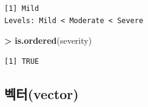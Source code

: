 \documentclass[11pt,a4paper]{book}
\newenvironment{Shaded}{\begin{snugshade}}{\end{snugshade}}
\newcommand{\KeywordTok}[1]{\textcolor[rgb]{0.13,0.29,0.53}{\textbf{#1}}}
\newcommand{\StringTok}[1]{\textcolor[rgb]{0.31,0.60,0.02}{#1}}
\newcommand{\OperatorTok}[1]{\textcolor[rgb]{0.81,0.36,0.00}{\textbf{#1}}}
\newcommand{\NormalTok}[1]{#1}
\theoremstyle{definition}
\theoremstyle{definition}
\theoremstyle{definition}
\theoremstyle{remark}
\begin{document}
\begin{verbatim}
[1] Mild
Levels: Mild < Moderate < Severe
\end{verbatim}

\begin{Shaded}
\begin{Highlighting}[]
\OperatorTok{>}\StringTok{ }\KeywordTok{is.ordered}\NormalTok{(severity)}
\end{Highlighting}
\end{Shaded}

\begin{verbatim}
[1] TRUE
\end{verbatim}

\normalsize

\subsection{벡터(vector)}\label{vector}
\end{document}
